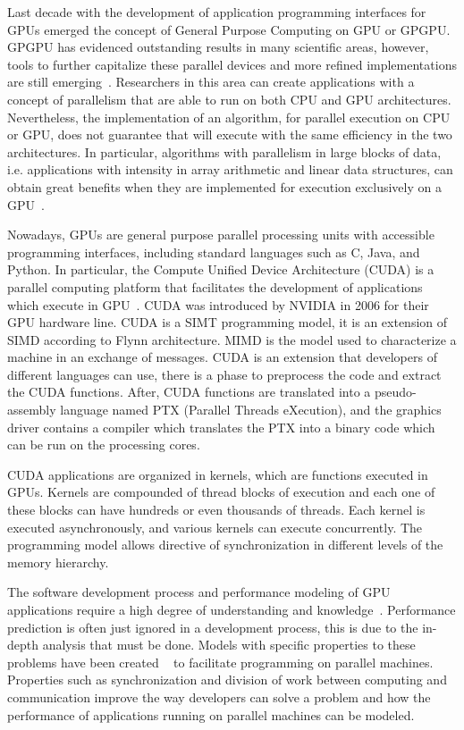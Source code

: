 Last decade with the development of application programming interfaces for GPUs emerged the concept of General Purpose Computing on GPU or GPGPU. GPGPU has evidenced outstanding results in many scientific areas, however, tools to further capitalize these parallel devices and more refined implementations are still emerging~\citep{CUDAGuide,bsgp}. Researchers in this area can create applications with a concept of parallelism that are able to run on both CPU and GPU architectures. Nevertheless, the implementation of an algorithm, for parallel execution on CPU or GPU, does not guarantee that will execute with the same efficiency in the two architectures. In particular, algorithms with parallelism in large blocks of data, i.e. applications with intensity in array arithmetic and linear data structures, can obtain great benefits when they are implemented for execution exclusively on a GPU~\citep{zhong2012data, Benedict:12}. 

Nowadays, GPUs are general purpose parallel processing units with accessible programming interfaces, including standard languages such as C, Java, and Python. In particular, the Compute Unified Device Architecture (CUDA) is a parallel computing platform that facilitates the development of applications which execute in GPU~\citep{CUDAGuide}. CUDA was introduced by NVIDIA in 2006 for their GPU hardware line. CUDA is a SIMT programming model, it is an extension of SIMD according to Flynn architecture. MIMD is the model used to characterize a machine in an exchange of messages. CUDA is an extension that developers of different languages can use, there is a phase to preprocess the code and extract the CUDA functions. After, CUDA functions are translated into a pseudo-assembly language named PTX  (Parallel Threads eXecution), and the graphics driver contains a compiler which translates the PTX into a binary code which can be run on the processing cores.

CUDA applications are organized in kernels, which are functions executed in GPUs. Kernels are compounded of thread blocks of execution and each one of these blocks can have hundreds or even thousands of threads. Each kernel is executed asynchronously, and various kernels can execute concurrently. The programming model allows directive of synchronization in different levels of the memory hierarchy.

The software development process and performance modeling of GPU applications require a high degree of understanding and knowledge~\citep{Baghsorkhi:2010:APM}. Performance prediction is often just ignored in a development process, this is due to the in-depth analysis that must be done. Models with specific properties to these problems have been created ~\citep{Skillicorn:1998:MLP} to facilitate programming on parallel machines.  Properties such as synchronization and division of work between computing and communication improve the way developers can solve a problem and how the performance of applications running on parallel machines can be modeled.


